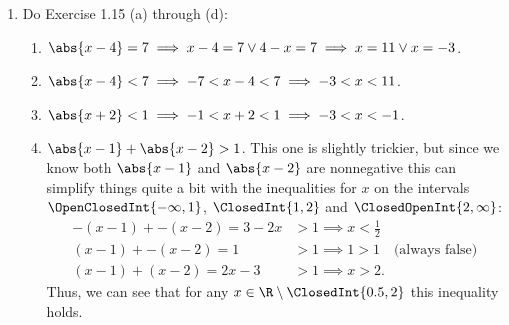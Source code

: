\documentclass{article}
\begin{document}
\begin{enumerate}
  \item Do Exercise 1.15 (a) through (d):
        \begin{enumerate}
                \item $\abs{x - 4} = 7 \implies x - 4 = 7 \lor 4 - x = 7 \implies x = 11 \lor x = -3$.
                \item $\abs{x - 4} < 7 \implies -7 < x - 4 < 7 \implies -3 < x < 11$.
                \item $\abs{x + 2} < 1 \implies -1 < x + 2 < 1 \implies -3 < x < -1$.
                \item $\abs{x - 1} + \abs{x - 2} > 1$.
                This one is slightly trickier, but since we know both $\abs{x-1}$ and $\abs{x-2}$ are nonnegative this
                can simplify things quite a bit with the inequalities for $x$ on the intervals
                $\OpenClosedInt{-\infty, 1}$, $\ClosedInt{1, 2}$ and $\ClosedOpenInt{2, \infty}$:
                \begin{align*}
                  -(x - 1) + -(x - 2) = 3 - 2x &> 1 \implies x < \frac{1}{2}\\
                  (x - 1) + -(x - 2) = 1 &> 1 \implies 1 > 1 \quad \textrm{(always false)}\\
                  (x - 1) + (x - 2) = 2x - 3 &> 1 \implies x > 2.
                \end{align*}
                Thus, we can see that for any $x \in \R \setminus \ClosedInt{0.5, 2}$ this inequality holds.
        \end{enumerate}
\end{enumerate}
\end{document}
